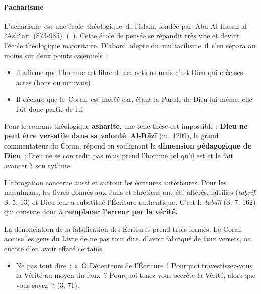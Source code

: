 \paragraph{l'acharisme}{{ L'acharisme~est une
école~{théologique}~de
l'{islam}, fondée
par~{Abu
Al-Hasan
al-ʾAshʿarī}~({873}-{935}).
(~). Cette école de pensée se répandit très vite et devint
l'école théologique majoritaire. D'abord adepte du~mu'tazilisme~il~s'en
sépara au moins sur deux points
essentiels~:} 
\begin{itemize}
    \item il affirme que l'homme est libre de ses actions mais
c'est Dieu qui crée ses actes (bons ou
mauvais)
\item Il déclare que le~Coran~est incréé car, étant la Parole de Dieu lui-même, elle fait donc partie de lui
\end{itemize}}


Pour le courant théologique \textbf{asharite}, une telle thèse est
impossible : \textbf{Dieu ne peut être versatile dans sa volonté}.
\textbf{Al-Rāzī} (m. 1209), le grand commentateur du Coran, répond en
soulignant la \textbf{dimension pédagogique de Dieu}~: Dieu ne se
contredit pas mais prend l'homme tel qu'il est et le fait avancer à son
rythme.


L'abrogation concerne aussi et surtout les écritures antérieures. Pour
les musulmans, les livres donnés aux Juifs et chrétiens ont été altérés,
falsifiés (\emph{taḥrīf}, S. 5, 13) et Dieu leur a substitué l'Écriture
authentique. C'est le \emph{tabdīl} (S. 7, 162) qui consiste donc à
\textbf{remplacer l'erreur par la vérité.}

La dénonciation de la falsification des Écritures prend trois formes. Le
Coran accuse les gens du Livre de ne pas tout dire, d'avoir fabriqué de
faux versets, ou encore d'en avoir effacé certains.

\begin{itemize}
\item
  Ne pas tout dire~: «~Ô Détenteurs de l'Écriture~! Pourquoi
  travestissez-vous la Vérité au moyen du faux~? Pourquoi tenez-vous
  secrète la Vérité, alors que vous savez~? (3, 71).
\end{itemize}


